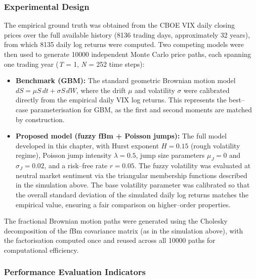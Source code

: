 \documentclass[12pt,a4paper]{report}
\numberwithin{equation}{section}
\begin{document}
\subsubsection{Experimental Design}

The empirical ground truth was obtained from the CBOE VIX daily closing prices over the full available history (8\hspace{1pt}136 trading days, approximately 32 years), from which 8\hspace{1pt}135 daily log returns were computed. Two competing models were then used to generate 10\hspace{1pt}000 independent Monte Carlo price paths, each spanning one trading year (\emph{T} = 1, \emph{N} = 252 time steps):

\begin{itemize}
\item \textbf{Benchmark (GBM):} The standard geometric Brownian motion model $dS = \mu S\,dt + \sigma S\,dW$, where the drift $\mu$ and volatility $\sigma$ were calibrated directly from the empirical daily VIX log returns. This represents the best--case parameterisation for GBM, as the first and second moments are matched by construction.

\item \textbf{Proposed model (fuzzy fBm + Poisson jumps):} The full model developed in this chapter, with Hurst exponent $H = 0.15$ (rough volatility regime), Poisson jump intensity $\lambda = 0.5$, jump size parameters $\mu_J = 0$ and $\sigma_J = 0.02$, and a risk--free rate $r = 0.05$. The fuzzy volatility was evaluated at neutral market sentiment via the triangular membership functions described in the simulation above. The base volatility parameter was calibrated so that the overall standard deviation of the simulated daily log returns matches the empirical value, ensuring a fair comparison on higher--order properties.
\end{itemize}

The fractional Brownian motion paths were generated using the Cholesky decomposition of the fBm covariance matrix (as in the simulation above), with the factorisation computed once and reused across all 10\hspace{1pt}000 paths for computational efficiency.

\subsubsection{Performance Evaluation Indicators}
\end{document}
